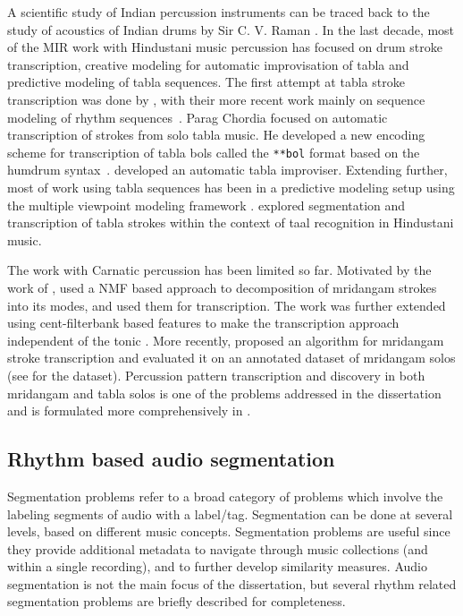 A scientific study of Indian percussion instruments can be traced back to the study of acoustics of Indian drums by Sir C. V. Raman \cite{raman:20:drum, raman:34:drums}. In the last decade, most of the \gls{MIR} work with Hindustani music percussion has focused on drum stroke transcription, creative modeling for automatic improvisation of \gls{tabla} and predictive modeling of \gls{tabla} sequences. The first attempt at \gls{tabla} stroke transcription was done by , with their more recent work mainly on sequence modeling of rhythm sequences~\cite{gillet:07:seq}. Parag Chordia \cite{chordia:05:phdthesis,chordia:05:tablaSeg} focused on automatic transcription of strokes from solo \gls{tabla} music. He developed a new encoding scheme for transcription of \gls{tabla} bols called the \texttt{**bol} format based on the humdrum syntax~\cite{huron:02:humdrum}.  developed an automatic \gls{tabla} improviser. Extending further, most of work using \gls{tabla} sequences has been in a predictive modeling setup using the multiple viewpoint modeling framework \cite{chordia:10:mvmacm,chordia:11:predTabla,chordia:10:mvmismir,sastry:11:thesis}.  explored segmentation and transcription of \gls{tabla} strokes within the context of \gls{taal} recognition in Hindustani music. 

The work with Carnatic percussion has been limited so far. Motivated by the work of ,  used a \gls{NMF} based approach to decomposition of mridangam strokes into its modes, and used them for transcription. The work was further extended using cent-filterbank based features to make the transcription approach independent of the tonic \cite{akshay:14:transcription}. More recently,  proposed an algorithm for mridangam stroke transcription and evaluated it on an annotated dataset of mridangam solos (see  for the dataset). Percussion pattern transcription and discovery in both mridangam and \gls{tabla} solos is one of the problems addressed in the dissertation and is formulated more comprehensively in . 
% 
\subsection{Rhythm based audio segmentation}
Segmentation problems refer to a broad category of problems which involve the labeling segments of audio with a label/tag. Segmentation can be done at several levels, based on different music concepts. Segmentation problems are useful since they provide additional metadata to navigate through music collections (and within a single recording), and to further develop similarity measures. Audio segmentation is not the main focus of the dissertation, but several rhythm related segmentation problems are briefly described for completeness. 

